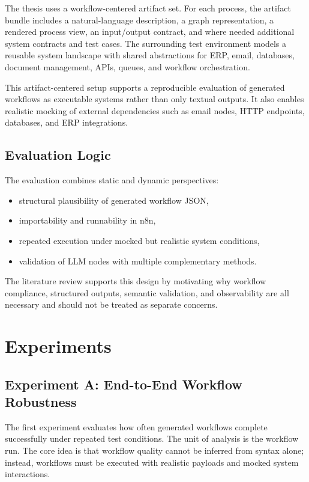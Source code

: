 \documentclass[12pt,a4paper]{article}
\begin{document}
The thesis uses a workflow-centered artifact set. For each process, the artifact bundle includes a natural-language description, a graph representation, a rendered process view, an input/output contract, and where needed additional system contracts and test cases. The surrounding test environment models a reusable system landscape with shared abstractions for ERP, email, databases, document management, APIs, queues, and workflow orchestration.

This artifact-centered setup supports a reproducible evaluation of generated workflows as executable systems rather than only textual outputs. It also enables realistic mocking of external dependencies such as email nodes, HTTP endpoints, databases, and ERP integrations.

\subsection{Evaluation Logic}

The evaluation combines static and dynamic perspectives:

\begin{itemize}[leftmargin=*]
  \item structural plausibility of generated workflow JSON,
  \item importability and runnability in n8n,
  \item repeated execution under mocked but realistic system conditions,
  \item validation of LLM nodes with multiple complementary methods.
\end{itemize}

The literature review supports this design by motivating why workflow compliance, structured outputs, semantic validation, and observability are all necessary and should not be treated as separate concerns.

\section{Experiments}

\subsection{Experiment A: End-to-End Workflow Robustness}

The first experiment evaluates how often generated workflows complete successfully under repeated test conditions. The unit of analysis is the workflow run. The core idea is that workflow quality cannot be inferred from syntax alone; instead, workflows must be executed with realistic payloads and mocked system interactions.
\end{document}
